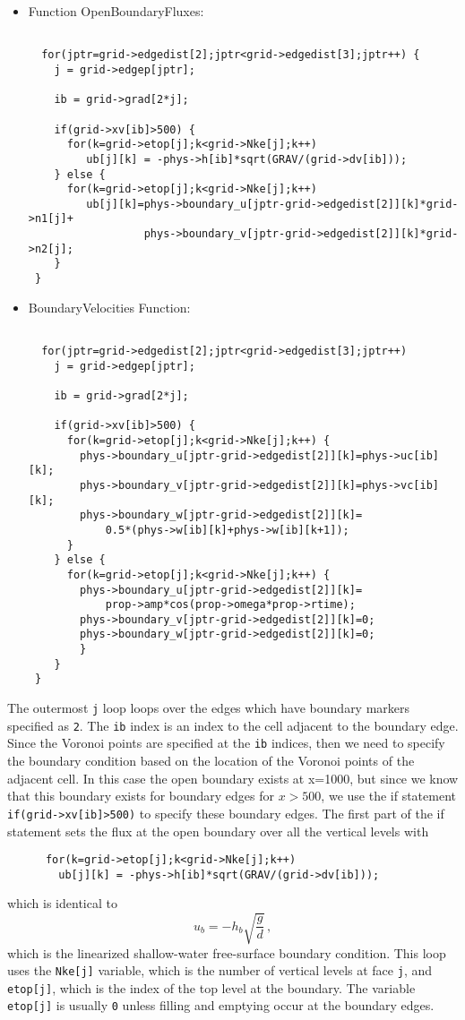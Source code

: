 \documentclass[12pt,oneside]{article}
\begin{document}
\begin{itemize}
\item Function OpenBoundaryFluxes:
\begin{verbatim}

  for(jptr=grid->edgedist[2];jptr<grid->edgedist[3];jptr++) {
    j = grid->edgep[jptr];

    ib = grid->grad[2*j];

    if(grid->xv[ib]>500) {
      for(k=grid->etop[j];k<grid->Nke[j];k++) 
         ub[j][k] = -phys->h[ib]*sqrt(GRAV/(grid->dv[ib]));
    } else {
      for(k=grid->etop[j];k<grid->Nke[j];k++) 
         ub[j][k]=phys->boundary_u[jptr-grid->edgedist[2]][k]*grid->n1[j]+
                  phys->boundary_v[jptr-grid->edgedist[2]][k]*grid->n2[j];
    }
 }

\end{verbatim}
\item BoundaryVelocities Function:
\begin{verbatim}

  for(jptr=grid->edgedist[2];jptr<grid->edgedist[3];jptr++) 
    j = grid->edgep[jptr];

    ib = grid->grad[2*j];

    if(grid->xv[ib]>500) {
      for(k=grid->etop[j];k<grid->Nke[j];k++) {
        phys->boundary_u[jptr-grid->edgedist[2]][k]=phys->uc[ib][k];
        phys->boundary_v[jptr-grid->edgedist[2]][k]=phys->vc[ib][k];
        phys->boundary_w[jptr-grid->edgedist[2]][k]=
            0.5*(phys->w[ib][k]+phys->w[ib][k+1]);
      } 
    } else {
      for(k=grid->etop[j];k<grid->Nke[j];k++) {
        phys->boundary_u[jptr-grid->edgedist[2]][k]=
            prop->amp*cos(prop->omega*prop->rtime);
        phys->boundary_v[jptr-grid->edgedist[2]][k]=0;
        phys->boundary_w[jptr-grid->edgedist[2]][k]=0;
        } 
    }
 }

\end{verbatim}
\end{itemize}
The outermost \verb+j+ loop loops over the edges which have boundary markers specified as \verb+2+.
The \verb+ib+ index is an index to the cell adjacent to the boundary edge.  Since the Voronoi points
are specified at the \verb+ib+ indices, then we need to specify the boundary condition based on
the location of the Voronoi points of the adjacent cell.  In this case the open boundary exists at x=1000, but since
we know that this boundary exists for boundary edges for $x>500$, we use the if statement
\verb+if(grid->xv[ib]>500)+ to specify these boundary edges.  The first part of the if statement
sets the flux at the open boundary over all the vertical levels with
\begin{verbatim}
      for(k=grid->etop[j];k<grid->Nke[j];k++) 
        ub[j][k] = -phys->h[ib]*sqrt(GRAV/(grid->dv[ib]));
\end{verbatim}
which is identical to 
\[ u_b = -h_b\sqrt{\frac{g}{d}} \,,\]
which is the linearized shallow-water free-surface boundary condition.  This loop uses
the \verb+Nke[j]+ variable, which is the number of vertical levels at face \verb+j+,
and \verb+etop[j]+, which is the index of the top level at the boundary.  The variable
\verb+etop[j]+ is usually \verb+0+ unless filling and emptying occur at the boundary
edges.  
\end{document}
